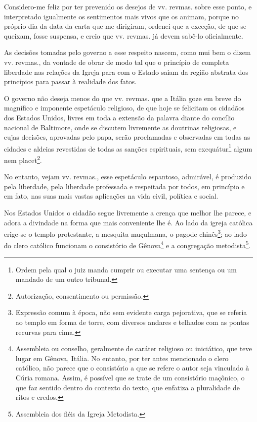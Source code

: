 Considero-me feliz por ter prevenido os desejos de vv. revmas. sobre
esse ponto, e interpretado igualmente os sentimentos mais vivos que os
animam, porque no próprio dia da data da carta que me dirigiram, ordenei
que a exceção, de que se queixam, fosse suspensa, e creio que vv.
revmas. já devem sabê-lo oficialmente.

As decisões tomadas pelo governo a esse respeito nascem, como mui bem o
dizem vv. revmas., da vontade de obrar de modo tal que o princípio de
completa liberdade nas relações da Igreja para com o Estado saiam da
região abstrata dos princípios para passar à realidade dos fatos.

O governo não deseja menos do que vv. revmas. que a Itália goze em breve
do magnífico e imponente espetáculo religioso, de que hoje se felicitam
os cidadãos dos Estados Unidos, livres em toda a extensão da palavra
diante do concílio nacional de Baltimore, onde se discutem livremente as
doutrinas religiosas, e cujas decisões, aprovadas pelo papa, serão
proclamadas e observadas em todas as cidades e aldeias revestidas de
todas as sanções espirituais, sem exequátur\footnote{Ordem pela qual o
  juiz manda cumprir ou executar uma sentença ou um mandado de um outro
  tribunal.} algum nem placet\footnote{Autorização, consentimento ou
  permissão.}.

No entanto, vejam vv. revmas., esse espetáculo espantoso, admirável, é
produzido pela liberdade, pela liberdade professada e respeitada por
todos, em princípio e em fato, nas suas mais vastas aplicações na vida
civil, política e social.

Nos Estados Unidos o cidadão segue livremente a crença que melhor lhe
parece, e adora a divindade na forma que mais conveniente lhe é. Ao lado
da igreja católica erige-se o templo protestante, a mesquita muçulmana,
o pagode chinês\footnote{Expressão comum à época, não sem evidente
  carga pejorativa, que se referia ao templo em forma de torre, com
  diversos andares e telhados com as pontas recurvas para cima.}; ao
lado do clero católico funcionam o consistório de Gênova\footnote{
  Assembleia ou conselho, geralmente de caráter religioso ou iniciático,
  que teve lugar em Gênova, Itália. No entanto, por ter antes mencionado
  o clero católico, não parece que o consistório a que se refere o autor
  seja vinculado à Cúria romana. Assim, é possível que se trate de um
  consistório maçônico, o que faz sentido dentro do contexto do texto,
  que enfatiza a pluralidade de ritos e credos.} e a congregação
metodista\footnote{Assembleia dos fiéis da Igreja Metodista.}.

